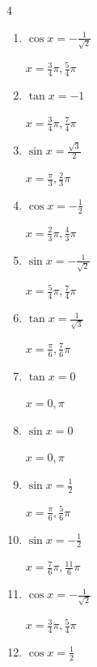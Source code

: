 \begin{multicols}{4}
\begin{enumerate}
  \item $\displaystyle \cos{x}  = -\frac{1}{\sqrt{2}}$

        $\displaystyle x = \frac{3}{4}\pi , \frac{5}{4}\pi$

  \item $\displaystyle \tan{x}  = -1$

        $\displaystyle x = \frac{3}{4}\pi , \frac{7}{4}\pi$

  \item $\displaystyle \sin{x}  = \frac{\sqrt{3}}{2}$

        $\displaystyle x = \frac{\pi}{3} , \frac{2}{3}\pi$

  \item $\displaystyle \cos{x}  = -\frac{1}{2}$

        $\displaystyle x = \frac{2}{3}\pi , \frac{4}{3}\pi$

  \item $\displaystyle \sin{x}  = -\frac{1}{\sqrt{2}}$

        $\displaystyle x = \frac{5}{4}\pi , \frac{7}{4}\pi$

  \item $\displaystyle \tan{x}  = \frac{1}{\sqrt{3}}$

        $\displaystyle x = \frac{\pi}{6} , \frac{7}{6}\pi$

  \item $\displaystyle \tan{x}  = 0$

        $\displaystyle x = 0 , \pi$

  \item $\displaystyle \sin{x}  = 0$

        $\displaystyle x = 0 , \pi$

\columnbreak %

  \item $\displaystyle \sin{x}  = \frac{1}{2}$

        $\displaystyle x = \frac{\pi}{6} , \frac{5}{6}\pi$

  \item $\displaystyle \sin{x}  = -\frac{1}{2}$

        $\displaystyle x = \frac{7}{6}\pi , \frac{11}{6}\pi$

  \item $\displaystyle \cos{x}  = -\frac{1}{\sqrt{2}}$

        $\displaystyle x = \frac{3}{4}\pi , \frac{5}{4}\pi$

  \item $\displaystyle \cos{x}  = \frac{1}{2}$


\end{enumerate}
\end{multicols}
